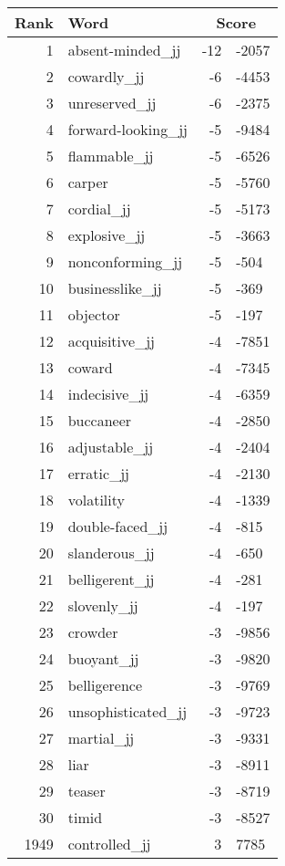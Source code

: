 \begin{longtable}[!htbp]{| rlr@{.}l |}
    \hline
    \textbf{Rank} & \textbf{Word} & \multicolumn{2}{c|}{\textbf{Score}} \\
    \hline
    \endhead
    1 & absent-minded\_jj & -12 & -2057 \\
    2 & cowardly\_jj & -6 & -4453 \\
    3 & unreserved\_jj & -6 & -2375 \\
    4 & forward-looking\_jj & -5 & -9484 \\
    5 & flammable\_jj & -5 & -6526 \\
    6 & carper & -5 & -5760 \\
    7 & cordial\_jj & -5 & -5173 \\
    8 & explosive\_jj & -5 & -3663 \\
    9 & nonconforming\_jj & -5 & -504 \\
    10 & businesslike\_jj & -5 & -369 \\
    11 & objector & -5 & -197 \\
    12 & acquisitive\_jj & -4 & -7851 \\
    13 & coward & -4 & -7345 \\
    14 & indecisive\_jj & -4 & -6359 \\
    15 & buccaneer & -4 & -2850 \\
    16 & adjustable\_jj & -4 & -2404 \\
    17 & erratic\_jj & -4 & -2130 \\
    18 & volatility & -4 & -1339 \\
    19 & double-faced\_jj & -4 & -815 \\
    20 & slanderous\_jj & -4 & -650 \\
    21 & belligerent\_jj & -4 & -281 \\
    22 & slovenly\_jj & -4 & -197 \\
    23 & crowder & -3 & -9856 \\
    24 & buoyant\_jj & -3 & -9820 \\
    25 & belligerence & -3 & -9769 \\
    26 & unsophisticated\_jj & -3 & -9723 \\
    27 & martial\_jj & -3 & -9331 \\
    28 & liar & -3 & -8911 \\
    29 & teaser & -3 & -8719 \\
    30 & timid & -3 & -8527 \\
    1949 & controlled\_jj & 3 & 7785 \\

\end{longtable}
